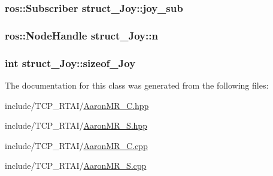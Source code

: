 \label{classstruct__Joy_ae2f0324335e5f6692d1e398c80c84979}
\hypertarget{classstruct__Joy_ae01b03fd078106377cefb61eed252fde}{
\subsubsection[{joy\_\-sub}]{\setlength{\rightskip}{0pt plus 5cm}ros::Subscriber {\bf struct\_\-Joy::joy\_\-sub}}}
\label{classstruct__Joy_ae01b03fd078106377cefb61eed252fde}
\hypertarget{classstruct__Joy_afc0b4423d122753e49a142768882b458}{
\subsubsection[{n}]{\setlength{\rightskip}{0pt plus 5cm}ros::NodeHandle {\bf struct\_\-Joy::n}}}
\label{classstruct__Joy_afc0b4423d122753e49a142768882b458}
\hypertarget{classstruct__Joy_a85b0158996d7206a23bf7012ceb23f9e}{
\subsubsection[{sizeof\_\-Joy}]{\setlength{\rightskip}{0pt plus 5cm}int {\bf struct\_\-Joy::sizeof\_\-Joy}}}
\label{classstruct__Joy_a85b0158996d7206a23bf7012ceb23f9e}


The documentation for this class was generated from the following files:\begin{DoxyCompactItemize}
\item 
include/TCP\_\-RTAI/\hyperlink{AaronMR__C_8hpp}{AaronMR\_\-C.hpp}\item 
include/TCP\_\-RTAI/\hyperlink{AaronMR__S_8hpp}{AaronMR\_\-S.hpp}\item 
include/TCP\_\-RTAI/\hyperlink{AaronMR__C_8cpp}{AaronMR\_\-C.cpp}\item 
include/TCP\_\-RTAI/\hyperlink{AaronMR__S_8cpp}{AaronMR\_\-S.cpp}\end{DoxyCompactItemize}
